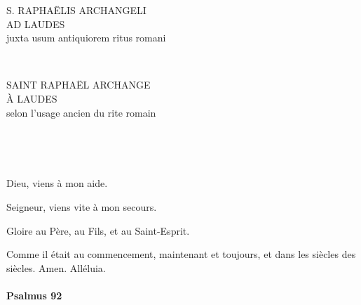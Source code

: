 \documentclass[twoside]{article}
\begin{document}
\null \newpage

\sloppy

\begin{paracol}[1]{2}

\begin{center}\begin{doublespace}

{
\MakeUppercase{\Large S. Raphaëlis Archangeli\\ad Laudes}\\
juxta usum antiquiorem ritus romani}
\end{doublespace}\end{center}


~~

\switchcolumn

\begin{center}\begin{doublespace}
{
\MakeUppercase{\Large Saint Raphaël Archange\\À Laudes}\\
selon l'usage ancien du rite romain
}
\end{doublespace}\end{center}

~~

~~

\vv Dieu, viens à mon aide.

\rr Seigneur, viens vite à mon secours.

\vv Gloire au Père, au Fils, et au Saint-Esprit.

\rr Comme il était au commencement, maintenant et toujours, et dans les siècles des siècles. Amen. Alléluia.

\switchcolumn*

\paragraph{Psalmus 92}



\end{paracol}
\end{document}
